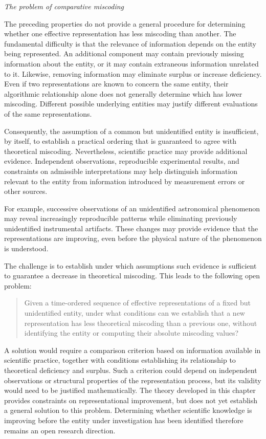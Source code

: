 \begin{remark}\emph{The problem of comparative miscoding}

The preceding properties do not provide a general procedure for determining whether one effective representation has less miscoding than another. The fundamental difficulty is that the relevance of information depends on the entity being represented. An additional component may contain previously missing information about the entity, or it may contain extraneous information unrelated to it. Likewise, removing information may eliminate surplus or increase deficiency. Even if two representations are known to concern the same entity, their algorithmic relationship alone does not generally determine which has lower miscoding. Different possible underlying entities may justify different evaluations of the same representations.

Consequently, the assumption of a common but unidentified entity is insufficient, by itself, to establish a practical ordering that is guaranteed to agree with theoretical miscoding. Nevertheless, scientific practice may provide additional evidence. Independent observations, reproducible experimental results, and constraints on admissible interpretations may help distinguish information relevant to the entity from information introduced by measurement errors or other sources.

For example, successive observations of an unidentified astronomical phenomenon may reveal increasingly reproducible patterns while eliminating previously unidentified instrumental artifacts. These changes may provide evidence that the representations are improving, even before the physical nature of the phenomenon is understood.

The challenge is to establish under which assumptions such evidence is sufficient to guarantee a decrease
in theoretical miscoding. This leads to the following open problem:

\begin{quote}
Given a time-ordered sequence of effective representations of a fixed but unidentified entity, under what conditions can we establish that a new representation has less theoretical miscoding than a previous one, without identifying the entity or computing their absolute miscoding values?
\end{quote}

A solution would require a comparison criterion based on information available in scientific practice, together with conditions establishing its relationship to theoretical deficiency and surplus. Such a criterion could depend on independent observations or structural properties of the representation process, but its validity would need to be justified mathematically. The theory developed in this chapter provides constraints on representational improvement, but does not yet establish a general solution to this problem. Determining whether scientific knowledge is improving before the entity under investigation has been identified therefore remains an open research direction.
\end{remark}

